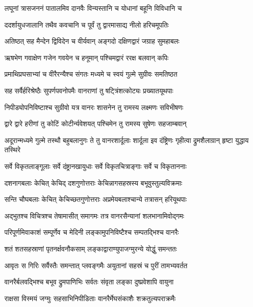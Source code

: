 \twolineshloka
{लघूनां त्रासजननं पातालमिव दानवैः}
{विन्यस्तानि च योधानां बहूनि विविधानि च} %

\twolineshloka
{ददर्शायुधजालानि तथैव कवचानि च}
{पूर्वं तु द्वारमासाद्य नीलो हरिचमूपतिः} %

\twolineshloka
{अतिष्ठत् सह मैन्देन द्विविदेन च वीर्यवान्}
{अङ्गदो दक्षिणद्वारं जग्राह सुमहाबलः} %

\twolineshloka
{ऋषभेण गवाक्षेण गजेन गवयेन च}
{हनूमान् पश्चिमद्वारं ररक्ष बलवान् कपिः} %

\twolineshloka
{प्रमाथिप्रघसाभ्यां च वीरैरन्यैश्च संगतः}
{मध्यमे च स्वयं गुल्मे सुग्रीवः समतिष्ठत} %

\twolineshloka
{सह सर्वैर्हरिश्रेष्ठैः सुपर्णपवनोपमैः}
{वानराणां तु षट्त्रिंशत्कोट्यः प्रख्यातयूथपाः} %

\twolineshloka
{निपीड्योपनिविष्टाश्च सुग्रीवो यत्र वानरः}
{शासनेन तु रामस्य लक्ष्मणः सविभीषणः} %

\twolineshloka
{द्वारे द्वारे हरीणां तु कोटिं कोटीर्न्यवेशयत्}
{पश्चिमेन तु रामस्य सुषेणः सहजाम्बवान्} %

\threelineshloka
{अदूरान्मध्यमे गुल्मे तस्थौ बहुबलानुगः}
{ते तु वानरशार्दूलाः शार्दूला इव दंष्ट्रिणः}
{गृहीत्वा द्रुमशैलाग्रान् हृष्टा युद्धाय तस्थिरे} %

\twolineshloka
{सर्वे विकृतलाङ्गूलाः सर्वे दंष्ट्रानखायुधाः}
{सर्वे विकृतचित्राङ्गाः सर्वे च विकृताननाः} %

\twolineshloka
{दशनागबलाः केचित् केचिद् दशगुणोत्तराः}
{केचिन्नागसहस्रस्य बभूवुस्तुल्यविक्रमाः} %

\twolineshloka
{सन्ति चौघबलाः केचित् केचिच्छतगुणोत्तराः}
{अप्रमेयबलाश्चान्ये तत्रासन् हरियूथपाः} %

\twolineshloka
{अद्भुतश्च विचित्रश्च तेषामासीत् समागमः}
{तत्र वानरसैन्यानां शलभानामिवोद्गमः} %

\twolineshloka
{परिपूर्णमिवाकाशं सम्पूर्णेव च मेदिनी}
{लङ्कामुपनिविष्टैश्च सम्पतद्भिश्च वानरैः} %

\twolineshloka
{शतं शतसहस्राणां पृतनर्क्षवनौकसाम्}
{लङ्काद्वाराण्युपाजग्मुरन्ये योद्धुं समन्ततः} %

\twolineshloka
{आवृतः स गिरिः सर्वैस्तैः समन्तात् प्लवङ्गमैः}
{अयुतानां सहस्रं च पुरीं तामभ्यवर्तत} %

\twolineshloka
{वानरैर्बलवद्भिश्च बभूव द्रुमपाणिभिः}
{सर्वतः संवृता लङ्का दुष्प्रवेशापि वायुना} %

\twolineshloka
{राक्षसा विस्मयं जग्मुः सहसाभिनिपीडिताः}
{वानरैर्मेघसंकाशैः शक्रतुल्यपराक्रमैः} %

